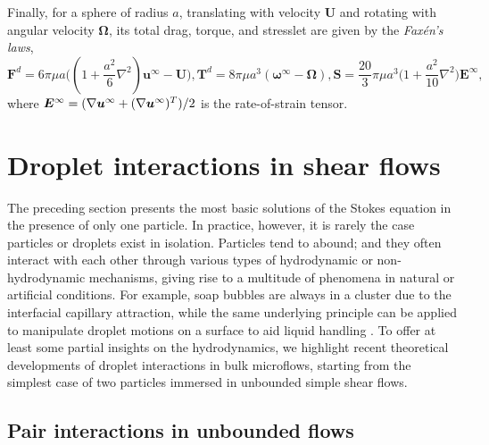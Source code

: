 Finally, for a sphere of radius $a$, translating with velocity $\bm U$ and rotating with angular velocity $\bm \Omega$, its total drag, torque, and stresslet are given by the \emph{Fax\'{e}n's laws},
\begin{subequations} \label{eq:faxen}
 \begin{equation}
   {\bm F}^{d} = 6\pi\mu a\bigg( (1+\frac{a^2}{6}\nabla^2){\bm u^\infty - {\bm U}} \bigg) ,
 \end{equation}
 \begin{equation}
  {\bm T}^{d} = 8\pi\mu a^3 ({\bm \omega}^\infty - {\bm \Omega}),
 \end{equation}
 \begin{equation}
   {\bm S} = \frac{20}{3}\pi\mu a^3 \bigg( 1+\frac{a^2}{10}\nabla^2 \bigg) {\bm E}^\infty ,
 \end{equation}
\end{subequations}
where $\small {\bm E}^\infty=(\nabla {\bm u}^\infty + (\nabla {\bm u}^\infty)^T)/2$ is the rate-of-strain tensor.


\section{Droplet interactions in shear flows}

The preceding section presents the most basic solutions of the Stokes equation in the presence of only one particle.
In practice, however, it is rarely the case particles or droplets exist in isolation.
Particles tend to abound; and they often interact with each other through various types of hydrodynamic or non-hydrodynamic mechanisms, giving rise to a multitude of phenomena in natural or artificial conditions.
For example, soap bubbles are always in a cluster due to the interfacial capillary attraction, while the same underlying principle can be applied to manipulate droplet motions on a surface to aid liquid handling \citep{vapour-sensing}.
To offer at least some partial insights on the hydrodynamics, we highlight recent theoretical developments of droplet interactions in bulk microflows, starting from the simplest case of two particles immersed in unbounded simple shear flows.

\subsection{Pair interactions in unbounded flows}

